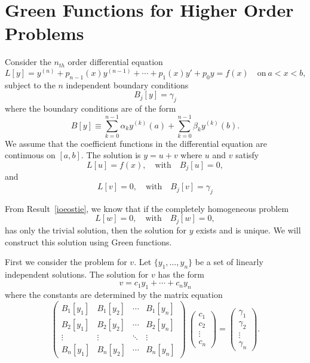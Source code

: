 \section{Green Functions for Higher Order Problems}

Consider the $n_{t h}$ order differential equation
\[
L[y] = y^{(n)} + p_{n-1}(x) y^{(n-1)} + \cdots + p_1(x) y' + p_0 y = f(x)
\quad \mathrm{on}\ a < x < b,
\]
subject to the $n$ independent boundary conditions
\[
B_j[y] = \gamma_j
\]
where the boundary conditions are of the form
\[
B[y] \equiv \sum_{k=0}^{n-1} \alpha_k y^{(k)}(a) 
+ \sum_{k=0}^{n-1} \beta_k y^{(k)}(b).
\]
We assume that the coefficient functions in the differential equation 
are continuous on $[a,b]$.
The solution is $y = u + v$ where $u$ and $v$ satisfy
\[
L[u] = f(x), \quad \mathrm{with} \quad B_j[u] = 0,
\]
and
\[
L[v] = 0, \quad \mathrm{with} \quad B_j[v] = \gamma_j
\]

From Result~\ref{ioeostie}, we know that if the completely homogeneous problem
\[
L[w] = 0, \quad \mathrm{with} \quad B_j[w] = 0,
\]
has only the trivial solution, then the solution for $y$ exists and is 
unique.  We will construct this solution using Green functions.




First we consider the problem for $v$.
Let $\{y_1,\ldots,y_n\}$ be a set of linearly
independent solutions.  The solution for $v$ has the form
\[
v = c_1 y_1 + \cdots + c_n y_n
\]
where the constants are determined by the matrix equation
\[
\begin{pmatrix}
  B_1[y_1] & B_1[y_2] & \cdots & B_1[y_n] \\
  B_2[y_1] & B_2[y_2] & \cdots & B_2[y_n] \\
  \vdots   & \vdots   & \ddots & \vdots   \\
  B_n[y_1] & B_n[y_2] & \cdots & B_n[y_n]
\end{pmatrix}
\
\begin{pmatrix}
  c_1 \\
  c_2 \\
  \vdots \\
  c_n
\end{pmatrix}
=
\begin{pmatrix}
  \gamma_1  \\
  \gamma_2  \\
  \vdots \\
  \gamma_n 
\end{pmatrix}.
\]


